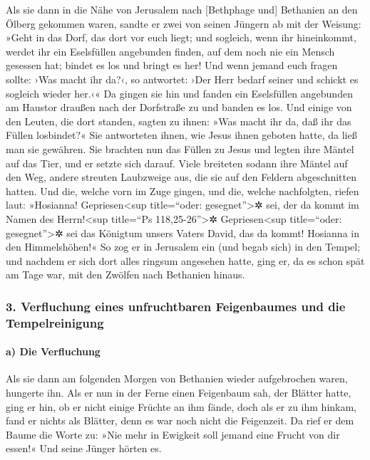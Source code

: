  Als sie dann in die Nähe von Jerusalem nach {[}Bethphage
und{]} Bethanien an den Ölberg gekommen waren, sandte er zwei von seinen
Jüngern ab  mit der Weisung: »Geht in das Dorf, das dort
vor euch liegt; und sogleich, wenn ihr hineinkommt, werdet ihr ein
Eselsfüllen angebunden finden, auf dem noch nie ein Mensch gesessen hat;
bindet es los und bringt es her!  Und wenn jemand euch
fragen sollte: ›Was macht ihr da?‹, so antwortet: ›Der Herr bedarf
seiner und schickt es sogleich wieder her.‹«  Da gingen
sie hin und fanden ein Eselsfüllen angebunden am Haustor draußen nach
der Dorfstraße zu und banden es los.  Und einige von den
Leuten, die dort standen, sagten zu ihnen: »Was macht ihr da, daß ihr
das Füllen losbindet?«  Sie antworteten ihnen, wie Jesus
ihnen geboten hatte, da ließ man sie gewähren.  Sie
brachten nun das Füllen zu Jesus und legten ihre Mäntel auf das Tier,
und er setzte sich darauf.  Viele breiteten sodann ihre
Mäntel auf den Weg, andere streuten Laubzweige aus, die sie auf den
Feldern abgeschnitten hatten.  Und die, welche vorn im
Zuge gingen, und die, welche nachfolgten, riefen laut: »Hosianna!
Gepriesen\textless sup title=``oder: gesegnet''\textgreater✲ sei, der da
kommt im Namen des Herrn!\textless sup title=``Ps
118,25-26''\textgreater✲  Gepriesen\textless sup
title=``oder: gesegnet''\textgreater✲ sei das Königtum unsers Vaters
David, das da kommt! Hosianna in den Himmelshöhen!«  So
zog er in Jerusalem ein (und begab sich) in den Tempel; und nachdem er
sich dort alles ringsum angesehen hatte, ging er, da es schon spät am
Tage war, mit den Zwölfen nach Bethanien hinaus.

\hypertarget{verfluchung-eines-unfruchtbaren-feigenbaumes-und-die-tempelreinigung}{%
\subsubsection{3. Verfluchung eines unfruchtbaren Feigenbaumes und die
Tempelreinigung}\label{verfluchung-eines-unfruchtbaren-feigenbaumes-und-die-tempelreinigung}}

\hypertarget{a-die-verfluchung}{%
\paragraph{a) Die Verfluchung}\label{a-die-verfluchung}}

 Als sie dann am folgenden Morgen von Bethanien wieder
aufgebrochen waren, hungerte ihn.  Als er nun in der
Ferne einen Feigenbaum sah, der Blätter hatte, ging er hin, ob er nicht
einige Früchte an ihm fände, doch als er zu ihm hinkam, fand er nichts
als Blätter, denn es war noch nicht die Feigenzeit.  Da
rief er dem Baume die Worte zu: »Nie mehr in Ewigkeit soll jemand eine
Frucht von dir essen!« Und seine Jünger hörten es.

